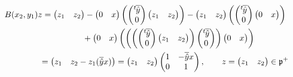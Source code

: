 \documentclass[pdftex]{sigma}
\numberwithin{equation}{section}
\newcommand{\fp}{\mathfrak{p}}
\begin{document}
\begin{gather*}
B(x_2,y_1)z =\begin{pmatrix}z_1& z_2\end{pmatrix}
-\begin{pmatrix}0& x\end{pmatrix}\left(\begin{pmatrix}{}^t\hspace{-1pt}\overline{\hat{y}}\\0\end{pmatrix}
\begin{pmatrix}z_1& z_2\end{pmatrix}\right)
-\begin{pmatrix}z_1& z_2\end{pmatrix}\left(\begin{pmatrix}{}^t\hspace{-1pt}\overline{\hat{y}}\\0\end{pmatrix}
\begin{pmatrix}0& x\end{pmatrix}\right)\\
\hphantom{B(x_2,y_1)z =}{} +\begin{pmatrix}0& x\end{pmatrix}\left(\left(\left(\begin{pmatrix}{}^t\hspace{-1pt}\overline{\hat{y}}\\0\end{pmatrix}
\begin{pmatrix}z_1& z_2\end{pmatrix}\right)\begin{pmatrix}{}^t\hspace{-1pt}\overline{\hat{y}}\\0\end{pmatrix}\right)
\begin{pmatrix}0& x\end{pmatrix}\right)\\
\hphantom{B(x_2,y_1)z }{} =\begin{pmatrix}z_1& z_2-z_1(\overline{\hat{y}}x)\end{pmatrix}
=\begin{pmatrix}z_1& z_2\end{pmatrix}\begin{pmatrix}1&-\overline{\hat{y}}x\\0&1\end{pmatrix},\qquad
 z=\begin{pmatrix}z_1& z_2\end{pmatrix}\in \fp^+
\end{gather*}
\end{document}
